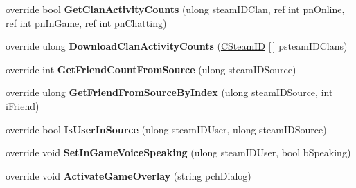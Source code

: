 \begin{DoxyCompactItemize}
\item 
\mbox{\label{class_valve_1_1_steamworks_1_1_c_steam_friends_aa64abdef5e8377ac38901b75e6092a6f}} 
override bool {\bfseries Get\+Clan\+Activity\+Counts} (ulong steam\+I\+D\+Clan, ref int pn\+Online, ref int pn\+In\+Game, ref int pn\+Chatting)
\item 
\mbox{\label{class_valve_1_1_steamworks_1_1_c_steam_friends_a8f508e5618b3ba92d51200137495e1e6}} 
override ulong {\bfseries Download\+Clan\+Activity\+Counts} (\hyperlink{struct_valve_1_1_steamworks_1_1_c_steam_i_d}{C\+Steam\+ID} \mbox{[}$\,$\mbox{]} psteam\+I\+D\+Clans)
\item 
\mbox{\label{class_valve_1_1_steamworks_1_1_c_steam_friends_a4ffa6d09978a1b2d0c25ae225f39281e}} 
override int {\bfseries Get\+Friend\+Count\+From\+Source} (ulong steam\+I\+D\+Source)
\item 
\mbox{\label{class_valve_1_1_steamworks_1_1_c_steam_friends_a1bc09658c1347673b04feaaa9b94b739}} 
override ulong {\bfseries Get\+Friend\+From\+Source\+By\+Index} (ulong steam\+I\+D\+Source, int i\+Friend)
\item 
\mbox{\label{class_valve_1_1_steamworks_1_1_c_steam_friends_a8a050afea78fc738ff4d60c0f9ec4f1e}} 
override bool {\bfseries Is\+User\+In\+Source} (ulong steam\+I\+D\+User, ulong steam\+I\+D\+Source)
\item 
\mbox{\label{class_valve_1_1_steamworks_1_1_c_steam_friends_aaa22d442418943ba42d1e6584ed9a256}} 
override void {\bfseries Set\+In\+Game\+Voice\+Speaking} (ulong steam\+I\+D\+User, bool b\+Speaking)
\item 
\mbox{\label{class_valve_1_1_steamworks_1_1_c_steam_friends_a6f7c34a1d53874a6899f59e5d2c006b1}} 
override void {\bfseries Activate\+Game\+Overlay} (string pch\+Dialog)
\item 
\mbox{\label{class_valve_1_1_steamworks_1_1_c_steam_friends_a590837ee78278476c6e4e9c18d390042}} 

\end{DoxyCompactItemize}
